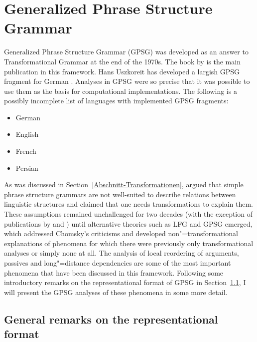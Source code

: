 
\chapter{Generalized Phrase Structure Grammar}
\label{Kapitel-GPSG}

Generalized Phrase Structure Grammar (GPSG) was developed as an answer %
to Transformational Grammar at the end of the 1970s. The book by \citet*{GKPS85a} is the main publication in
this framework. Hans Uszkoreit has developed a largish GPSG fragment for German \citeyearpar{Uszkoreit87a}.
Analyses in GPSG were so precise that it was possible to use them as the basis for computational implementations.
The following is a possibly incomplete list of languages with implemented GPSG fragments:
\begin{itemize}
\item German \citep{Weisweber87a-u,WP92b,Naumann87a-u,Naumann88-u-gekauft,Volk88}
\item English \citep*{Evans85a-u,PT85a-u,Phillips92a-u,GCB93a-u}
\item French \citep*{EdSB96a}
\item Persian \citep*{BSM2011a}
\end{itemize}

As was discussed in Section~\ref{Abschnitt-Transformationen}, \citet{Chomsky57a} argued that simple phrase structure
grammars are not well-suited to describe relations between linguistic structures and claimed that one needs transformations to
explain them. These assumptions remained unchallenged for two decades (with the exception of publications by 
and ) until alternative theories such as LFG and GPSG emerged, which addressed Chomsky's criticisms and developed non"=transformational explanations of phenomena for which there were previously only transformational analyses
or simply none at all. The analysis of local reordering of arguments, passives and long"=distance dependencies are some of the most important phenomena
that have been discussed in this framework. Following some introductory remarks on the representational format of GPSG in Section~\ref{sec-Representationsformat}, I will
present the GPSG analyses of these phenomena in some more detail.

\section{General remarks on the representational format}
\label{sec-Representationsformat}

